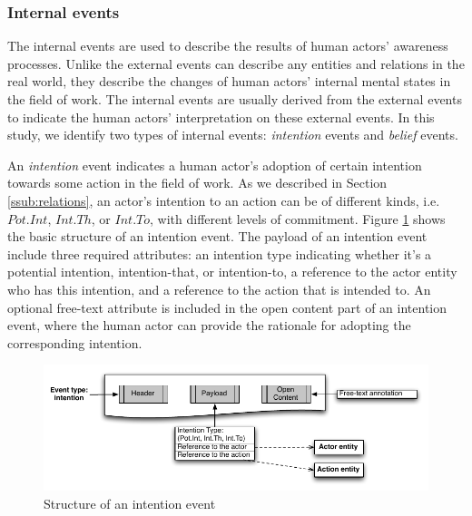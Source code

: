 \subsubsection{Internal events} %
\label{ssub:internal_events}
The internal events are used to describe the results of human actors' awareness processes. Unlike the external events can describe any entities and relations in the real world, they describe the changes of human actors' internal mental states in the field of work. The internal events are usually derived from the external events to indicate the human actors' interpretation on these external events. In this study, we identify two types of internal events: \emph{intention} events and \emph{belief} events. 

An \emph{intention} event indicates a human actor's adoption of certain intention towards some action in the field of work. As we described in Section \ref{ssub:relations}, an actor's intention to an action can be of different kinds, i.e. $Pot.Int$, $Int.Th$, or $Int.To$, with  different levels of commitment. Figure \ref{fig:intention_event} shows the basic structure of an intention event. The payload of an intention event include three required attributes: an intention type indicating whether it's a potential intention, intention-that, or intention-to, a reference to the actor entity who has this intention, and a reference to the action that is intended to. An optional free-text attribute is included in the open content part of an intention event, where the human actor can provide the rationale for adopting the corresponding intention.
\begin{figure}[htbp] %
	\centering
	\includegraphics{intention_event.pdf} 
	\caption{Structure of an intention event}
	\label{fig:intention_event}
\end{figure}

